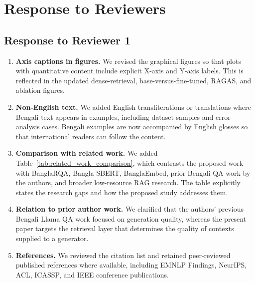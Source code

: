 \documentclass[manuscript,screen,review]{acmart}
\begin{document}
\section{Response to Reviewers}

\subsection*{Response to Reviewer 1}
\begin{enumerate}
    \item \textbf{Axis captions in figures.} We revised the graphical figures so that plots with quantitative content include explicit X-axis and Y-axis labels. This is reflected in the updated dense-retrieval, base-versus-fine-tuned, RAGAS, and ablation figures.
    \item \textbf{Non-English text.} We added English transliterations or translations where Bengali text appears in examples, including dataset samples and error-analysis cases. Bengali examples are now accompanied by English glosses so that international readers can follow the content.
    \item \textbf{Comparison with related work.} We added Table~\ref{tab:related_work_comparison}, which contrasts the proposed work with BanglaRQA, Bangla SBERT, BanglaEmbed, prior Bengali QA work by the authors, and broader low-resource RAG research. The table explicitly states the research gaps and how the proposed study addresses them.
    \item \textbf{Relation to prior author work.} We clarified that the authors' previous Bengali Llama QA work focused on generation quality, whereas the present paper targets the retrieval layer that determines the quality of contexts supplied to a generator.
    \item \textbf{References.} We reviewed the citation list and retained peer-reviewed published references where available, including EMNLP Findings, NeurIPS, ACL, ICASSP, and IEEE conference publications.
\end{enumerate}
\end{document}
